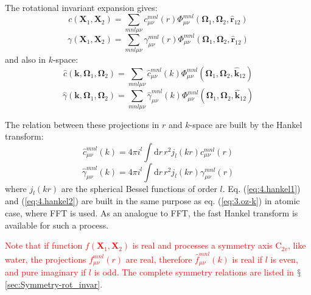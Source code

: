 The rotational invariant expansion gives:
\begin{equation}
c(\mathbf{X}_{1},\mathbf{X}_{2})=\sum_{mnl\mu\nu}c_{\mu\nu}^{mnl}(r)\Phi_{\mu\nu}^{mnl}(\mathbf{\Omega}_{1},\mathbf{\Omega}_{2},\mathbf{\hat{r}}_{12})
\end{equation}
\begin{equation}
\gamma(\mathbf{X}_{1},\mathbf{X}_{2})=\sum_{mnl\mu\nu}\gamma_{\mu\nu}^{mnl}(r)\Phi_{\mu\nu}^{mnl}(\mathbf{\Omega}_{1},\mathbf{\Omega}_{2},\mathbf{\hat{r}}_{12})
\end{equation}
and also in $k$-space:
\begin{equation}
\hat{c}(\mathbf{k},\mathbf{\Omega}_{1},\mathbf{\Omega}_{2})=\sum_{mnl\mu\nu}\hat{c}_{\mu\nu}^{mnl}(k)\Phi_{\mu\nu}^{mnl}(\mathbf{\Omega}_{1},\mathbf{\Omega}_{2},\mathbf{\hat{k}}_{12})
\end{equation}
\begin{equation}
\hat{\gamma}(\mathbf{k},\mathbf{\Omega}_{1},\mathbf{\Omega}_{2})=\sum_{mnl\mu\nu}\hat{\gamma}_{\mu\nu}^{mnl}(k)\Phi_{\mu\nu}^{mnl}(\mathbf{\Omega}_{1},\mathbf{\Omega}_{2},\mathbf{\hat{k}}_{12})
\end{equation}

The relation between these projections in $r$ and $k$-space are
built by the Hankel transform:
\begin{equation}
\hat{c}_{\mu\nu}^{mnl}(k)=4\pi i^{l}\int\mathrm{d}r\,r^{2}j_{l}(kr)c_{\mu\nu}^{mnl}(r)\label{eq:4.hankel1}
\end{equation}
\begin{equation}
\hat{\gamma}_{\mu\nu}^{mnl}(k)=4\pi i^{l}\int\mathrm{d}r\,r^{2}j_{l}(kr)\gamma_{\mu\nu}^{mnl}(r)\label{eq:4.hankel2}
\end{equation}
where $j_{l}(kr)$ are the spherical Bessel functions of order $l$.
Eq. (\ref{eq:4.hankel1}) and (\ref{eq:4.hankel2}) are built in the
same purpose as eq. (\ref{eq:3.oz-k}) in atomic case, where \acs{FFT}
is used. As an analogue to \acs{FFT}, the fast Hankel transform is
available for such a process. 

\textcolor{red}{Note that if function $f(\mathbf{X}_{1},\mathbf{X}_{2})$
is real and processes a symmetry axis $\mathrm{C}_{2v}$, like water,
the projections $f_{\mu\nu}^{mnl}(r)$ are real, therefore $\hat{f}_{\mu\nu}^{mnl}(k)$
is real if $l$ is even, and pure imaginary if $l$ is odd. The complete
symmetry relations are listed in $\mathsection$\ref{sec:Symmetry-rot_invar}.}

